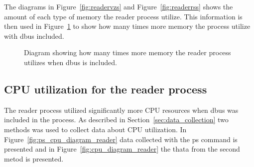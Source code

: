 The diagrams in Figure~\ref{fig:readervzs} and Figure~\ref{fig:readerrss} shows the amount of each type of memory the reader process utilize. This information is then used in Figure~\ref{fig:readertimesmore} to show how many times more memory the process utilize with dbus included.

\begin{figure}[H]
    \centering
    \caption{Diagram showing how many times more memory the reader process utilizes when dbus is included.}
    \label{fig:readertimesmore}
\end{figure}

\subsection{CPU utilization for the reader process}
The reader process utilized significantly more CPU resources when dbus was included in the process. As described in Section~\ref{sec:data_collection} two methods was used to collect data about CPU utilization. In Figure~\ref{fig:ps_cpu_diagram_reader} data collected with the ps command is presented and in Figure~\ref{fig:cpu_diagram_reader} the thata from the second metod is presented.

